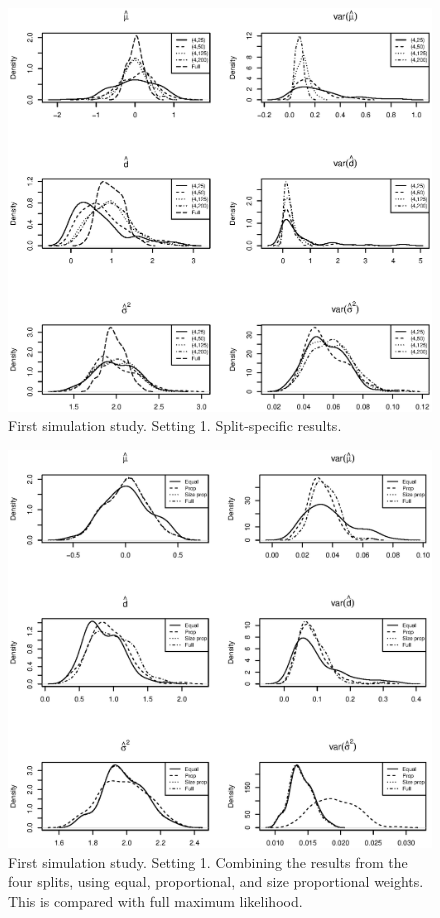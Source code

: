 \documentclass[11pt,a5paper,twoside]{book}
\begin{document}
{\begin{figure}[!t]
\centering
\includegraphics[width=\textwidth]{aCS150.eps}
\caption{\small \linespread{1.1} First simulation study. Setting 1. Split-specific results.} \label{CS150}
\end{figure}
\begin{figure}[!t]
\centering
\includegraphics[width=\textwidth]{aCS150COMB.eps}
\caption{\small \linespread{1.1} First simulation study. Setting 1. Combining the results from the four splits, using equal, proportional, and size proportional weights. This is compared with full maximum likelihood.} \label{CS150COMB}
\end{figure}



}
\end{document}
